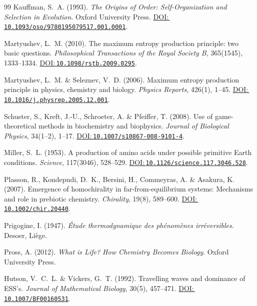 \documentclass[12pt,a4paper]{article}
\newcommand{\doilink}[1]{\href{https://doi.org/#1}{DOI:\,\nolinkurl{#1}}}
\theoremstyle{remark}
\begin{document}
\begin{thebibliography}{99}
Kauffman, S.~A. (1993).
\newblock \textit{The Origins of Order: Self-Organization and Selection in Evolution}.
\newblock Oxford University Press.
\newblock \doilink{10.1093/oso/9780195079517.001.0001}.

Martyushev, L.~M. (2010).
\newblock The maximum entropy production principle: two basic questions.
\newblock \textit{Philosophical Transactions of the Royal Society B}, 365(1545), 1333--1334.
\newblock \doilink{10.1098/rstb.2009.0295}.

Martyushev, L.~M. \& Seleznev, V.~D. (2006).
\newblock Maximum entropy production principle in physics, chemistry and biology.
\newblock \textit{Physics Reports}, 426(1), 1--45.
\newblock \doilink{10.1016/j.physrep.2005.12.001}.

Schuster, S., Kreft, J.-U., Schroeter, A. \& Pfeiffer, T. (2008).
\newblock Use of game-theoretical methods in biochemistry and biophysics.
\newblock \textit{Journal of Biological Physics}, 34(1--2), 1--17.
\newblock \doilink{10.1007/s10867-008-9101-4}.

Miller, S.~L. (1953).
\newblock A production of amino acids under possible primitive Earth conditions.
\newblock \textit{Science}, 117(3046), 528--529.
\newblock \doilink{10.1126/science.117.3046.528}.


Plasson, R., Kondepudi, D.~K., Bersini, H., Commeyras, A. \& Asakura, K. (2007).
\newblock Emergence of homochirality in far-from-equilibrium systems: Mechanisms and role in prebiotic chemistry.
\newblock \textit{Chirality}, 19(8), 589--600.
\newblock \doilink{10.1002/chir.20440}.

Prigogine, I. (1947).
\newblock \textit{Étude thermodynamique des phénomènes irréversibles}.
\newblock Desoer, Liège.

Pross, A. (2012).
\newblock \textit{What is Life? How Chemistry Becomes Biology}.
\newblock Oxford University Press.

Hutson, V.~C.~L. \& Vickers, G.~T. (1992).
\newblock Travelling waves and dominance of ESS's.
\newblock \textit{Journal of Mathematical Biology}, 30(5), 457--471.
\newblock \doilink{10.1007/BF00160531}.


\end{thebibliography}
\end{document}
